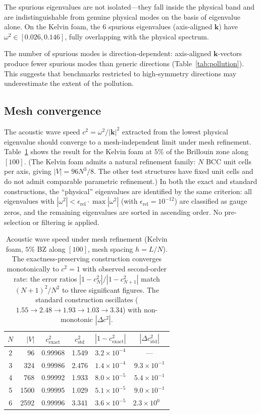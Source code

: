 \documentclass[preprint,12pt]{elsarticle}
\begin{document}
The spurious eigenvalues are not isolated---they fall inside the physical band and are indistinguishable from genuine physical modes on the basis of eigenvalue alone. On the Kelvin foam, the 6 spurious eigenvalues (axis-aligned $\mathbf{k}$) have $\omega^2 \in [0.026, 0.146]$, fully overlapping with the physical spectrum.

The number of spurious modes is direction-dependent: axis-aligned $\mathbf{k}$-vectors produce fewer spurious modes than generic directions (Table~\ref{tab:pollution}). This suggests that benchmarks restricted to high-symmetry directions may underestimate the extent of the pollution.

\subsection{Mesh convergence}
\label{sec:continuum}

The acoustic wave speed $c^2 = \omega^2/|\mathbf{k}|^2$ extracted from the lowest physical eigenvalue should converge to a mesh-independent limit under mesh refinement. Table~\ref{tab:convergence} shows the result for the Kelvin foam at $5\%$ of the Brillouin zone along $[100]$. (The Kelvin foam admits a natural refinement family: $N$ BCC unit cells per axis, giving $|V| = 96 N^3/8$. The other test structures have fixed unit cells and do not admit comparable parametric refinement.) In both the exact and standard constructions, the ``physical'' eigenvalues are identified by the same criterion: all eigenvalues with $|\omega^2| < \epsilon_{\mathrm{rel}} \cdot \max|\omega^2|$ (with $\epsilon_{\mathrm{rel}} = 10^{-12}$) are classified as gauge zeros, and the remaining eigenvalues are sorted in ascending order. No pre-selection or filtering is applied.

\begin{table}[h]
\centering
\begin{tabular}{crcccc}
\toprule
$N$ & $|V|$ & $c^2_{\mathrm{exact}}$ & $c^2_{\mathrm{std}}$ & $|1 - c^2_{\mathrm{exact}}|$ & $|\Delta c^2_{\mathrm{std}}|$ \\
\midrule
2 &   96 & 0.99968 & 1.549 & $3.2\times10^{-4}$ & ---     \\
3 &  324 & 0.99986 & 2.476 & $1.4\times10^{-4}$ & $9.3\times10^{-1}$ \\
4 &  768 & 0.99992 & 1.933 & $8.0\times10^{-5}$ & $5.4\times10^{-1}$ \\
5 & 1500 & 0.99995 & 1.029 & $5.1\times10^{-5}$ & $9.0\times10^{-1}$ \\
6 & 2592 & 0.99996 & 3.341 & $3.6\times10^{-5}$ & $2.3\times10^{0\phantom{-}}$ \\
\bottomrule
\end{tabular}
\caption{Acoustic wave speed under mesh refinement (Kelvin foam, $5\%$ BZ along $[100]$, mesh spacing $h = L/N$). The exactness-preserving construction converges monotonically to $c^2 = 1$ with observed second-order rate: the error ratios $|1-c^2_N|/|1-c^2_{N+1}|$ match $(N{+}1)^2/N^2$ to three significant figures. The standard construction oscillates ($1.55 \to 2.48 \to 1.93 \to 1.03 \to 3.34$) with non-monotonic $|\Delta c^2|$.}
\label{tab:convergence}
\end{table}
\end{document}
